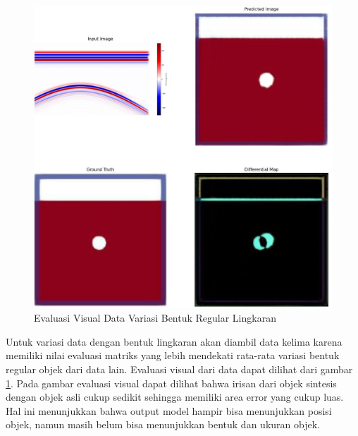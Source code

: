 \documentclass[conference]{IEEEtran}
\begin{document}
\begin{figure}[ht]
  \centering
  \includegraphics[scale=0.15]{gambar/diffMapLingkaran.jpg}
  \caption{Evaluasi Visual Data Variasi Bentuk Regular Lingkaran}
  \label{fig:diffmaplingkaran}
\end{figure}

Untuk variasi data dengan bentuk lingkaran akan diambil data kelima karena memiliki nilai evaluasi matriks yang lebih mendekati rata-rata variasi bentuk regular objek dari data lain. 
Evaluasi visual dari data dapat dilihat dari gambar \ref{fig:diffmaplingkaran}. 
Pada gambar evaluasi visual dapat dilihat bahwa irisan dari objek sintesis dengan objek asli cukup sedikit sehingga memiliki area error yang cukup luas. 
Hal ini menunjukkan bahwa output model hampir bisa menunjukkan posisi objek, namun masih belum bisa menunjukkan bentuk dan ukuran objek.
\end{document}

